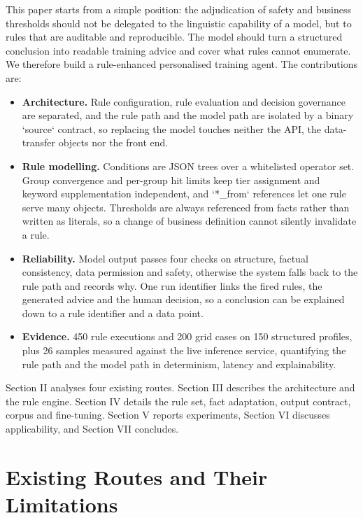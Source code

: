 \documentclass[conference]{IEEEtran}
\begin{document}
This paper starts from a simple position: the adjudication of safety and business thresholds should not be delegated to the linguistic capability of a model, but to rules that are auditable and reproducible. The model should turn a structured conclusion into readable training advice and cover what rules cannot enumerate. We therefore build a rule-enhanced personalised training agent. The contributions are:


\begin{itemize}

\item \textbf{Architecture.} Rule configuration, rule evaluation and decision governance are separated, and the rule path and the model path are isolated by a binary `source` contract, so replacing the model touches neither the API, the data-transfer objects nor the front end.

\item \textbf{Rule modelling.} Conditions are JSON trees over a whitelisted operator set. Group convergence and per-group hit limits keep tier assignment and keyword supplementation independent, and `*\_from` references let one rule serve many objects. Thresholds are always referenced from facts rather than written as literals, so a change of business definition cannot silently invalidate a rule.

\item \textbf{Reliability.} Model output passes four checks on structure, factual consistency, data permission and safety, otherwise the system falls back to the rule path and records why. One run identifier links the fired rules, the generated advice and the human decision, so a conclusion can be explained down to a rule identifier and a data point.

\item \textbf{Evidence.} 450 rule executions and 200 grid cases on 150 structured profiles, plus 26 samples measured against the live inference service, quantifying the rule path and the model path in determinism, latency and explainability.

\end{itemize}

Section II analyses four existing routes. Section III describes the architecture and the rule engine. Section IV details the rule set, fact adaptation, output contract, corpus and fine-tuning. Section V reports experiments, Section VI discusses applicability, and Section VII concludes.


\section{Existing Routes and Their Limitations}
\end{document}
